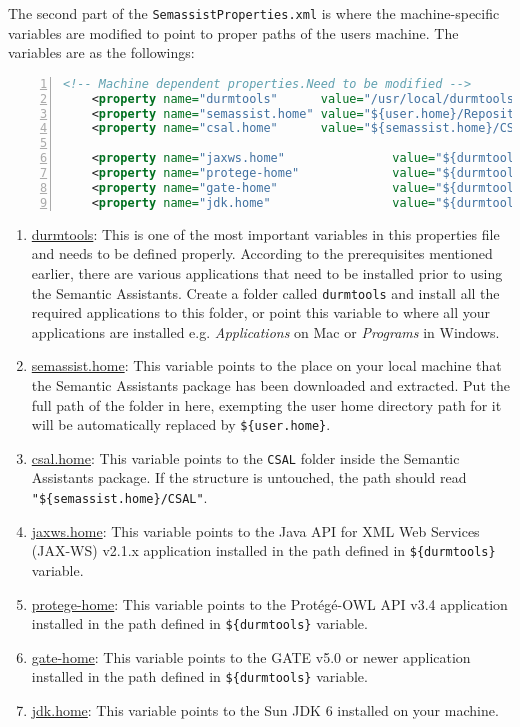 The second part of the \texttt{SemassistProperties.xml} is where the machine-specific variables are modified to point to proper paths of the users machine. The variables are as the followings:
\begin{lstlisting}[language=XML,numbers=left,xleftmargin=8mm,columns=flexible]
    <!-- Machine dependent properties.Need to be modified -->
    <property name="durmtools"      value="/usr/local/durmtools" />
    <property name="semassist.home" value="${user.home}/Repository/durm/Projects/SemanticAssistants" />
    <property name="csal.home"      value="${semassist.home}/CSAL" />

    <property name="jaxws.home"               value="${durmtools}/jaxws-ri" />
    <property name="protege-home"             value="${durmtools}/Protege" />
    <property name="gate-home"                value="${durmtools}/GATE/gate" />
    <property name="jdk.home"                 value="${durmtools}/jdk" />
\end{lstlisting}

\begin{enumerate}
\item \url{durmtools}: This is one of the most important variables in this properties file and needs to be defined properly. According to the prerequisites mentioned earlier, there are various applications that need to be installed prior to using the Semantic Assistants.
Create a folder called \texttt{durmtools} and install all the required applications to this folder, or point this variable to where all your applications are installed e.g. \emph{Applications} on Mac or \emph{Programs} in Windows.
\item \url{semassist.home}: This variable points to the place on your local machine that the Semantic Assistants package has been downloaded and extracted. Put the full path of the folder in here, exempting the user home directory path for it will be automatically replaced by \texttt{\$\{user.home\}}.
\item \url{csal.home}: This variable points to the \texttt{CSAL} folder inside the Semantic Assistants package. If the structure is untouched, the path should read \texttt{"\$\{semassist.home\}/CSAL"}.
\item \url{jaxws.home}: This variable points to the Java API for XML Web Services (JAX-WS) v2.1.x application installed in the path defined in \texttt{\$\{durmtools\}} variable.
\item \url{protege-home}: This variable points to the Prot\'{e}g\'{e}-OWL API v3.4 application installed in the path defined in \texttt{\$\{durmtools\}} variable.
\item \url{gate-home}: This variable points to the GATE v5.0 or newer application installed in the path defined in \texttt{\$\{durmtools\}} variable.
\item \url{jdk.home}: This variable points to the Sun JDK 6 installed on your machine.
\end{enumerate}



